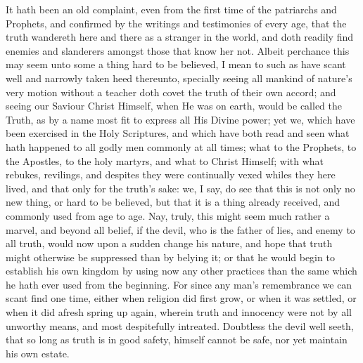 It hath been an old complaint, even from the first time of the patriarchs
and Prophets, and confirmed by the writings and testimonies of every
age, that the truth wandereth here and there as a stranger in the world,
and doth readily find enemies and slanderers amongst those that know
her not. Albeit perchance this may seem unto some a thing hard
to be believed, I mean to such as have scant well and narrowly taken
heed thereunto, specially seeing all mankind of nature’s very
motion without a teacher doth covet the truth of their own accord; and
seeing our Saviour Christ Himself, when He was on earth, would be called
the Truth, as by a name most fit to express all His Divine power; yet
we, which have been exercised in the Holy Scriptures, and which have
both read and seen what hath happened to all godly men commonly
at all times; what to the Prophets, to the Apostles, to the holy martyrs,
and what to Christ Himself; with what rebukes, revilings, and despites
they were continually vexed whiles they here lived, and that only for
the truth’s sake: we, I say, do see that this is not only no new
thing, or hard to be believed, but that it is a thing already received,
and commonly used from age to age. Nay, truly, this might seem
much rather a marvel, and beyond all belief, if the devil, who is the
father of lies, and enemy to all truth, would now upon a sudden change
his nature, and hope that truth might otherwise be suppressed than by
belying it; or that he would begin to establish his own kingdom by using
now any other practices than the same which he hath ever used from the
beginning. For since any man’s remembrance we can scant
find one time, either when religion did first grow, or when it was settled,
or when it did afresh spring up again, wherein truth and innocency were
not by all unworthy means, and most despitefully intreated. Doubtless
the devil well seeth, that so long as truth is in good safety, himself
cannot be safe, nor yet maintain his own estate.

